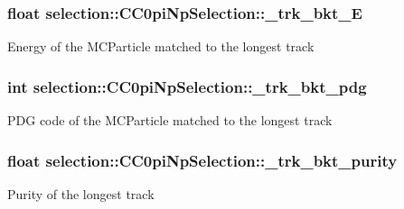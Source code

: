 \subsubsection[{\texorpdfstring{\+\_\+trk\+\_\+bkt\+\_\+E}{_trk_bkt_E}}]{\setlength{\rightskip}{0pt plus 5cm}float selection\+::\+C\+C0pi\+Np\+Selection\+::\+\_\+trk\+\_\+bkt\+\_\+E\hspace{0.3cm}{\ttfamily [private]}}\hypertarget{classselection_1_1CC0piNpSelection_aa7a6076f1169185e0b2b02fbb03aba22}{}\label{classselection_1_1CC0piNpSelection_aa7a6076f1169185e0b2b02fbb03aba22}
Energy of the M\+C\+Particle matched to the longest track 
\subsubsection[{\texorpdfstring{\+\_\+trk\+\_\+bkt\+\_\+pdg}{_trk_bkt_pdg}}]{\setlength{\rightskip}{0pt plus 5cm}int selection\+::\+C\+C0pi\+Np\+Selection\+::\+\_\+trk\+\_\+bkt\+\_\+pdg\hspace{0.3cm}{\ttfamily [private]}}\hypertarget{classselection_1_1CC0piNpSelection_a7044de37ee4f3615ffe4bb15e9f00f8e}{}\label{classselection_1_1CC0piNpSelection_a7044de37ee4f3615ffe4bb15e9f00f8e}
P\+DG code of the M\+C\+Particle matched to the longest track 
\subsubsection[{\texorpdfstring{\+\_\+trk\+\_\+bkt\+\_\+purity}{_trk_bkt_purity}}]{\setlength{\rightskip}{0pt plus 5cm}float selection\+::\+C\+C0pi\+Np\+Selection\+::\+\_\+trk\+\_\+bkt\+\_\+purity\hspace{0.3cm}{\ttfamily [private]}}\hypertarget{classselection_1_1CC0piNpSelection_a39a84b873306f200a2350b4804429791}{}\label{classselection_1_1CC0piNpSelection_a39a84b873306f200a2350b4804429791}
Purity of the longest track 
